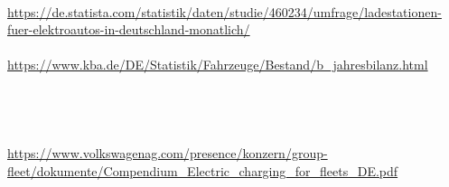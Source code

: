 \begin{parcolumns}[colwidths={1=2.5 cm, 2=10 cm, 3=2.5cm}]{3}
{\begin{tiny}
\\\\\\\\\\\\\\\\\\\\\\\\\\\\\\\\\\\\\\\\\\\\\\\url{https://de.statista.com/statistik/daten/studie/460234/umfrage/ladestationen-fuer-elektroautos-in-deutschland-monatlich/}\\ \\ \url{https://www.kba.de/DE/Statistik/Fahrzeuge/Bestand/b_jahresbilanz.html} \\ \\ \\ \\ \\ \url{https://www.volkswagenag.com/presence/konzern/group-fleet/dokumente/Compendium_Electric_charging_for_fleets_DE.pdf} \\ 
\end{tiny}}
\end{parcolumns}
